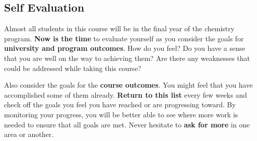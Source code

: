 \subsection{Self Evaluation}

Almost all students in this course will be in the final year of the chemistry program. \textbf{Now is the time} to evaluate yourself as you consider the goals for \textbf{university and program outcomes}. How do you feel? Do you have a sense that you are well on the way to achieving them? Are there any weaknesses that could be addressed while taking this course?

Also consider the goals for the \textbf{course outcomes}. You might feel that you have accomplished some of them already. \textbf{Return to this list} every few weeks and check off the goals you feel you have reached or are progressing toward. By monitoring your progress, you will be better able to see where more work is needed to ensure that all goals are met. Never hesitate to \textbf{ask for more} in one area or another.


